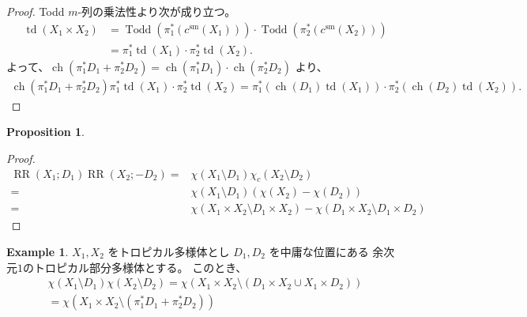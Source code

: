\documentclass[a4paper,dvipdfmx,reqno,12pt]{amsart}
\theoremstyle{definition}
\newtheorem{example}[theorem]{Example}
\newtheorem{proposition}[theorem]{Proposition}
\newcommand{\opn}[1]{\operatorname{#1}}
\numberwithin{equation}{section}
\begin{document}
\begin{proof}
Todd $m$-列の乗法性より次が成り立つ。
\begin{align}
\opn{td}(X_1\times X_2)
&=\opn{Todd}(\pi^{*}_1(c^{\mathrm{sm}}(X_1)))
\cdot \opn{Todd}(\pi^{*}_2(c^{\mathrm{sm}}(X_2))) \\
&=\pi^{*}_1\opn{td}(X_1)\cdot 
\pi^{*}_2\opn{td}(X_2).
\end{align}
よって、$\opn{ch}(\pi_1^{*}D_1+\pi_2^{*}D_2)=
\opn{ch}(\pi_1^{*}D_1)\cdot \opn{ch}(\pi_2^{*}D_2)$
より、
\begin{align}
\opn{ch}(\pi_1^{*}D_1+\pi_2^{*}D_2)
\pi^{*}_1\opn{td}(X_1)\cdot 
\pi^{*}_2\opn{td}(X_2)=
\pi_1^{*}(\opn{ch}(D_1)\opn{td}(X_1))\cdot
\pi_2^{*}(\opn{ch}(D_2)\opn{td}(X_2)).
\end{align}

\end{proof}

\begin{proposition}

\end{proposition}
\begin{proof}

\begin{align}
\opn{RR}(X_1;D_1)
\opn{RR}(X_2;-D_2)
= &\chi(X_1\setminus D_1)\chi_c(X_2\setminus D_2) \\
= &\chi(X_1\setminus D_1)
(\chi(X_2)-\chi(D_2)) \\
= &\chi(X_1\times X_2\setminus D_1\times X_2)
-\chi(D_1\times X_2\setminus D_1\times D_2)
\end{align}

\end{proof}




\begin{example}
$X_1,X_2$ をトロピカル多様体とし 
$D_1,D_2$ を中庸な位置にある
余次元$1$のトロピカル部分多様体とする。
このとき、
\begin{align}
\chi(X_1\setminus D_1)\chi(X_2\setminus D_2)
=\chi(X_1\times X_2 \setminus (D_1\times X_2\cup X_1\times D_2)) \\
=\chi(X_1\times X_2 \setminus (\pi_1^{*}D_1+\pi_2^{*}D_2))
\end{align}

\end{example}
\end{document}
